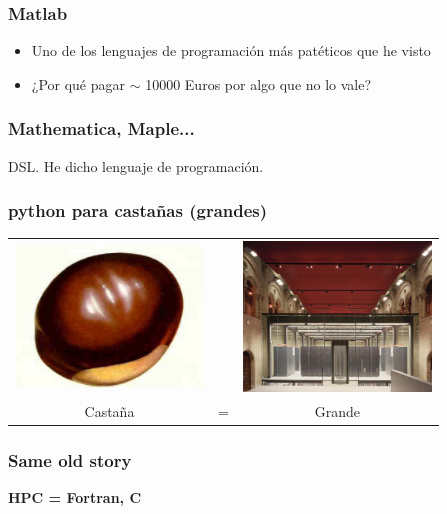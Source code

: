 \documentclass{beamer}
\begin{document}
\begin{frame}
  \frametitle{Matlab}
  \begin{itemize}
  \item Uno de los lenguajes de programación más patéticos que he
    visto
  \item ¿Por qué pagar $\sim$ 10000 Euros por algo que no lo vale?
  \end{itemize}
\end{frame}

\begin{frame}
  \frametitle{Mathematica, Maple...}
  \begin{center}
    DSL. He dicho lenguaje de programación.
  \end{center}
\end{frame}





\begin{frame}
 \frametitle{python para castañas (grandes)}
  \begin{center}
 \begin{tabular}[h]{ccc}
   \includegraphics[width=5cm]{files/castana.jpg}& &
   \includegraphics[width=5cm]{files/marenostrum.jpg}\\
   Castaña & = & Grande
 \end{tabular}
\end{center}
\end{frame}

\begin{frame}
  \frametitle{Same old story}
  \begin{center}
    \begin{Huge}
      \textbf{HPC = Fortran, C}
    \end{Huge}
  \end{center}
\end{frame}
\end{document}
